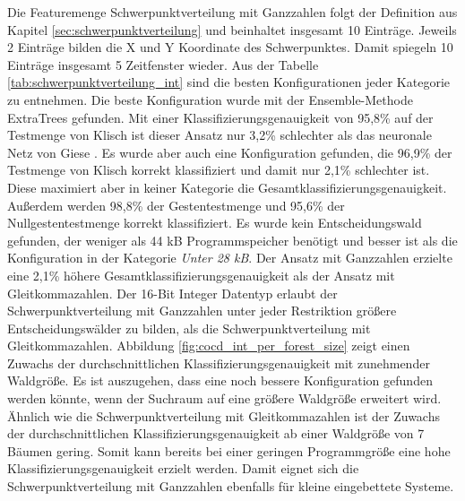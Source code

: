Die Featuremenge Schwerpunktverteilung mit Ganzzahlen folgt der Definition aus Kapitel \ref{sec:schwerpunktverteilung} und beinhaltet insgesamt 10 Einträge. Jeweils 2 Einträge bilden die X und Y
Koordinate des Schwerpunktes. Damit spiegeln 10 Einträge insgesamt 5 Zeitfenster wieder.
\newline
\newline
Aus der Tabelle \ref{tab:schwerpunktverteilung_int} sind die besten Konfigurationen jeder Kategorie zu entnehmen. Die beste Konfiguration wurde mit der Ensemble-Methode ExtraTrees gefunden.
Mit einer Klassifizierungsgenauigkeit von 95,8\% auf der Testmenge von Klisch ist dieser Ansatz nur 3,2\% schlechter als das neuronale Netz von Giese \cite{gieseThesis}. Es wurde aber auch eine Konfiguration
gefunden, die 96,9\% der Testmenge von Klisch korrekt klassifiziert und damit nur 2,1\% schlechter ist. Diese maximiert aber in keiner Kategorie die Gesamtklassifizierungsgenauigkeit.
Außerdem werden 98,8\% der Gestentestmenge und 95,6\% der Nullgestentestmenge korrekt klassifiziert. Es wurde kein Entscheidungswald gefunden, der weniger als 44 kB Programmspeicher benötigt und besser ist als die
Konfiguration in der Kategorie \textit{Unter 28 kB}.
\newline
\newline
Der Ansatz mit Ganzzahlen erzielte eine 2,1\% höhere Gesamtklassifizierungsgenauigkeit als der Ansatz mit Gleitkommazahlen. Der 16-Bit Integer Datentyp erlaubt der Schwerpunktverteilung mit Ganzzahlen unter jeder
Restriktion größere Entscheidungswälder zu bilden, als die Schwerpunktverteilung mit Gleitkommazahlen. Abbildung \ref{fig:cocd_int_per_forest_size} zeigt einen Zuwachs der durchschnittlichen Klassifizierungsgenauigkeit
mit zunehmender Waldgröße. Es ist auszugehen, dass eine noch bessere Konfiguration gefunden werden könnte, wenn der Suchraum auf eine größere Waldgröße erweitert wird. Ähnlich wie die Schwerpunktverteilung mit
Gleitkommazahlen ist der Zuwachs der durchschnittlichen Klassifizierungsgenauigkeit ab einer Waldgröße von 7 Bäumen gering. Somit kann bereits bei einer geringen Programmgröße eine hohe Klassifizierungsgenauigkeit
erzielt werden. Damit eignet sich die Schwerpunktverteilung mit Ganzzahlen ebenfalls für kleine eingebettete Systeme.
